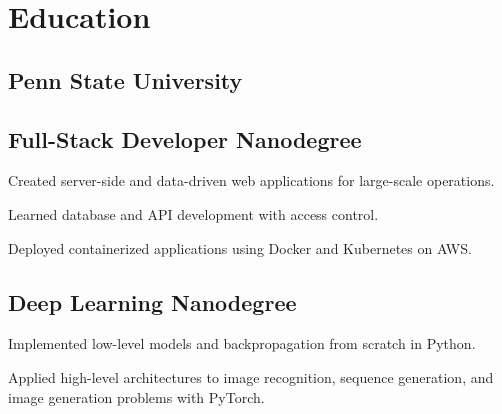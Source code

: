 \documentclass[]{deedy-resume-openfont}
\begin{document}
\begin{minipage}[t]{0.33\textwidth}
\section{Education}

\subsection{Penn State University}
\sectionsep

\subsection{Full-Stack Developer Nanodegree}
\begin{tightemize}
    \item Created server-side and data-driven web applications for large-scale operations.
    \item Learned database and API development with access control.
    \item Deployed containerized applications using Docker and Kubernetes on AWS.
\end{tightemize}
\sectionsep

\subsection{Deep Learning Nanodegree}
\begin{tightemize}
    \item Implemented low-level models and backpropagation from scratch in Python.
    \item Applied high-level architectures to image recognition, sequence generation, and image generation problems with PyTorch.
\end{tightemize}
\sectionsep



\end{minipage}
\end{document}
